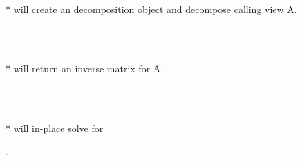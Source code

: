 \hspace*{1.9cm}\parbox{.8\textwidth}{\vspace{.3cm}\hspace*{1cm} \\*
will create an  decomposition object and decompose calling view A.}\\
\hspace*{1.9cm}\parbox{.8\textwidth}{\vspace{.3cm}\hspace*{1cm} \\*
will return an inverse matrix for A.}\\
\hspace*{1.9cm}\parbox{.8\textwidth}{\vspace{.3cm}\hspace*{1cm} \\*
will in-place solve  for }.\vspace*{.3cm}\\
%
%
